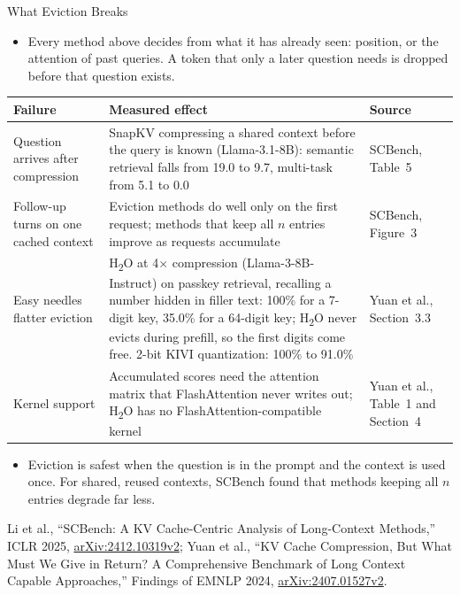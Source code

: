 \begin{frame}{What Eviction Breaks}
  \begin{itemize}\footnotesize
    \item[\textcolor{red}{$\blacktriangleright$}] Every method above decides from what it has already seen: position, or the attention of past queries. A token that only a later question needs is dropped before that question exists.
  \end{itemize}
  \vspace{0.1em}
  {\centering\scriptsize
  \begin{tabular}{>{\raggedright\arraybackslash}p{2.4cm} >{\raggedright\arraybackslash}p{7.7cm} >{\raggedright\arraybackslash}p{2.2cm}}
    \toprule
    \textbf{Failure} & \textbf{Measured effect} & \textbf{Source} \\
    \midrule
    Question arrives after compression & SnapKV compressing a shared context before the query is known (Llama-3.1-8B): semantic retrieval falls from 19.0 to 9.7, multi-task from 5.1 to 0.0 & SCBench, Table~5 \\
    \addlinespace[0.15em]
    Follow-up turns on one cached context & Eviction methods do well only on the first request; methods that keep all $n$ entries improve as requests accumulate & SCBench, Figure~3 \\
    \addlinespace[0.15em]
    Easy needles flatter eviction & H\textsubscript{2}O at 4$\times$ compression (Llama-3-8B-Instruct) on passkey retrieval, recalling a number hidden in filler text: 100\% for a 7-digit key, 35.0\% for a 64-digit key; H\textsubscript{2}O never evicts during prefill, so the first digits come free. 2-bit KIVI quantization: 100\% to 91.0\% & Yuan et al., Section~3.3 \\
    \addlinespace[0.15em]
    Kernel support & Accumulated scores need the attention matrix that FlashAttention never writes out; H\textsubscript{2}O has no FlashAttention-compatible kernel & Yuan et al., Table~1 and Section~4 \\
    \bottomrule
  \end{tabular}\par}
  \vspace{0.2em}
  \begin{itemize}\footnotesize
    \item[\textcolor{red}{$\blacktriangleright$}] Eviction is safest when the question is in the prompt and the context is used once. For shared, reused contexts, SCBench found that methods keeping all $n$ entries degrade far less.
  \end{itemize}
  {\scriptsize Li et al., ``SCBench: A KV Cache-Centric Analysis of Long-Context Methods,'' ICLR 2025, \href{https://arxiv.org/abs/2412.10319v2}{arXiv:2412.10319v2}; Yuan et al., ``KV Cache Compression, But What Must We Give in Return? A Comprehensive Benchmark of Long Context Capable Approaches,'' Findings of EMNLP 2024, \href{https://arxiv.org/abs/2407.01527v2}{arXiv:2407.01527v2}.\par}
\end{frame}
